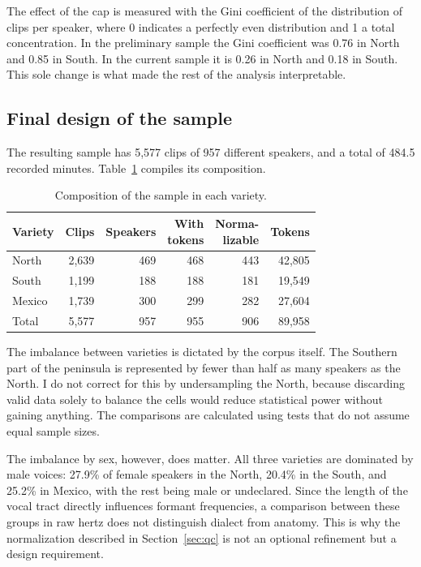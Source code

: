 \documentclass[11pt]{article}
\begin{document}
The effect of the cap is measured with the Gini coefficient of the distribution
of clips per speaker, where 0 indicates a perfectly even distribution and 1 a
total concentration. In the preliminary sample the Gini coefficient was 0.76 in
North and 0.85 in South. In the current sample it is 0.26 in North and 0.18 in
South. This sole change is what made the rest of the analysis interpretable.

\subsection{Final design of the sample}
\label{sec:sample}

The resulting sample has 5,577 clips of 957 different speakers, and a total of
484.5 recorded minutes. Table~\ref{tab:sample} compiles its composition.

\begin{table}[t]
\centering
\small
\setlength{\tabcolsep}{4pt}
\begin{tabular}{lrrrrr}
\toprule
Variety & Clips & Speakers & \makecell{With\\tokens} & \makecell{Norma-\\lizable} & Tokens \\
\midrule
North  & 2,639 & 469 & 468 & 443 & 42,805 \\
South  & 1,199 & 188 & 188 & 181 & 19,549 \\
Mexico & 1,739 & 300 & 299 & 282 & 27,604 \\
\midrule
Total  & 5,577 & 957 & 955 & 906 & 89,958 \\
\bottomrule
\end{tabular}
\caption{Composition of the sample in each variety.}
\label{tab:sample}
\end{table}

The imbalance between varieties is dictated by the corpus itself. The Southern
part of the peninsula is represented by fewer than half as many speakers as the
North. I do not correct for this by undersampling the North, because discarding
valid data solely to balance the cells would reduce statistical power without
gaining anything. The comparisons are calculated using tests that do not assume
equal sample sizes.

The imbalance by sex, however, does matter. All three varieties are dominated by
male voices: 27.9\% of female speakers in the North, 20.4\% in the South, and
25.2\% in Mexico, with the rest being male or undeclared. Since the length of the
vocal tract directly influences formant frequencies, a comparison between these
groups in raw hertz does not distinguish dialect from anatomy. This is why the
normalization described in Section~\ref{sec:qc} is not an optional refinement but
a design requirement.
\end{document}

